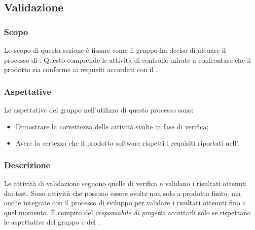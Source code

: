 \subsection{Validazione}
\subsubsection{Scopo}
Lo scopo di questa sezione è fissare come il gruppo ha deciso di attuare il processo di . Questo comprende le attività di controllo mirate a confrontare che il prodotto sia conforme ai requisiti accordati con il .

\subsubsection{Aspettative}
Le aspettative del gruppo \Gruppo{} nell'utilizzo di questo processo sono:
\begin{itemize}
	\item Dimostrare la correttezza delle attività svolte in fase di verifica; 
	\item Avere la certezza che il prodotto software rispetti i requisiti riportati nell'\AdRv.
\end{itemize}

\subsubsection{Descrizione}
Le attività di validazione seguono quelle di verifica e validano i risultati ottenuti dai test. Sono attività che possono essere svolte non solo a prodotto finito, ma anche integrate con il processo di sviluppo per validare i risultati ottenuti fino a quel momento. È compito del \textit{responsabile di progetto} accettarli solo se rispettano le aspettative del gruppo e del . 

